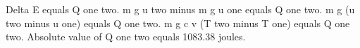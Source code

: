 Delta E equals Q one two.  
m g u two minus m g u one equals Q one two.  
m g (u two minus u one) equals Q one two.  
m g c v (T two minus T one) equals Q one two.  
Absolute value of Q one two equals 1083.38 joules.